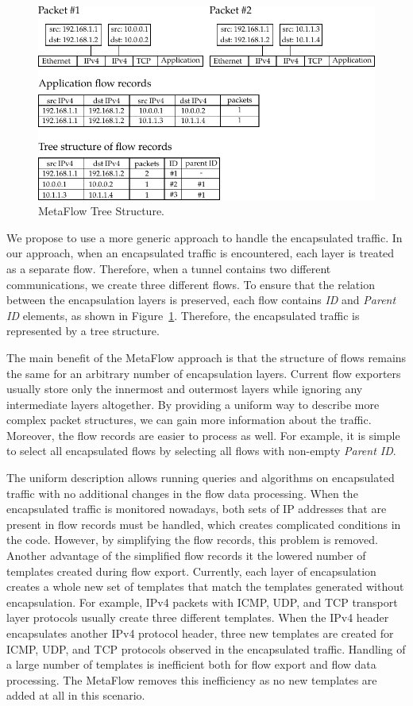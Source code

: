 \begin{figure}[!tb]
    \centering 
    \includegraphics{figures/c07/metaflow}
    \caption{MetaFlow Tree Structure.}
    \label{fig:metaflow}
\end{figure}

We propose to use a more generic approach to handle the encapsulated traffic. In our approach, when an encapsulated traffic is encountered, each layer is treated as a separate flow. Therefore, when a tunnel contains two different communications, we create three different flows. To ensure that the relation between the encapsulation layers is preserved, each flow contains \emph{ID} and \emph{Parent ID} elements, as shown in Figure~\ref{fig:metaflow}. Therefore, the encapsulated traffic is represented by a tree structure.

The main benefit of the MetaFlow approach is that the structure of flows remains the same for an arbitrary number of encapsulation layers. Current flow exporters usually store only the innermost and outermost layers while ignoring any intermediate layers altogether. By providing a uniform way to describe more complex packet structures, we can gain more information about the traffic. Moreover, the flow records are easier to process as well. For example, it is simple to select all encapsulated flows by selecting all flows with non-empty \emph{Parent ID}.

The uniform description allows running queries and algorithms on encapsulated traffic with no additional changes in the flow data processing. When the encapsulated traffic is monitored nowadays, both sets of IP addresses that are present in flow records must be handled, which creates complicated conditions in the code. However, by simplifying the flow records, this problem is removed. Another advantage of the simplified flow records it the lowered number of templates created during flow export. Currently, each layer of encapsulation creates a whole new set of templates that match the templates generated without encapsulation. For example, IPv4 packets with ICMP, UDP, and TCP transport layer protocols usually create three different templates. When the IPv4 header encapsulates another IPv4 protocol header, three new templates are created for ICMP, UDP, and TCP protocols observed in the encapsulated traffic. Handling of a large number of templates is inefficient both for flow export and flow data processing. The MetaFlow removes this inefficiency as no new templates are added at all in this scenario.

